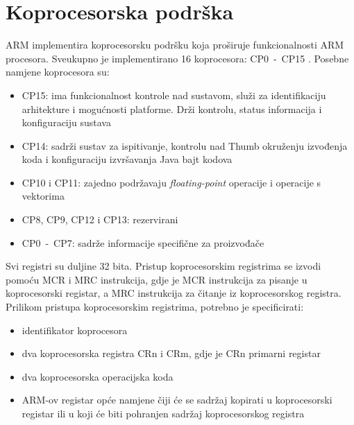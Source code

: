 \documentclass[times, utf8, diplomski, numeric]{fer}
\begin{document}
\section{Koprocesorska podrška}
ARM implementira koprocesorsku podršku koja proširuje funkcionalnosti ARM procesora. Sveukupno je implementirano 16 koprocesora:
CP0~-~CP15 \cite{arch_man}. Posebne namjene koprocesora su:
\begin{itemize}
  \item{CP15: ima funkcionalnost kontrole nad sustavom, služi za identifikaciju arhitekture i mogućnosti platforme. Drži
  kontrolu, status informacija i konfiguraciju sustava}
  \item{CP14: sadrži sustav za ispitivanje, kontrolu nad Thumb okruženju izvođenja koda i konfiguraciju izvršavanja Java
  bajt kodova}
  \item{CP10 i CP11: zajedno podržavaju \textit{floating-point} operacije i operacije s vektorima}
  \item{CP8, CP9, CP12 i CP13: rezervirani}
  \item{CP0~-~CP7: sadrže informacije specifične za proizvođače}
\end{itemize}
Svi registri su duljine 32 bita. Pristup koprocesorskim registrima se izvodi pomoću MCR i MRC instrukcija, gdje je MCR
instrukcija za pisanje u koprocesorski registar, a MRC instrukcija za čitanje iz koprocesorskog registra.
Prilikom pristupa koprocesorskim registrima, potrebno je specificirati:
\begin{itemize}
  \item{identifikator koprocesora}
  \item{dva koprocesorska registra CRn i CRm, gdje je CRn primarni registar}
  \item{dva koprocesorska operacijska koda}
  \item{ARM-ov registar opće namjene čiji će se sadržaj kopirati u koprocesorski registar ili u koji će biti pohranjen
  sadržaj koprocesorskog registra}
\end{itemize}
\end{document}
